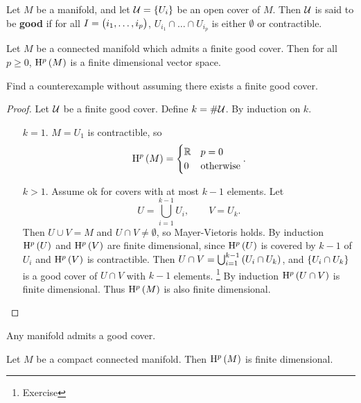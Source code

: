 \begin{definition}
Let $ M $ be a manifold, and let $ \UUU = \cbr{U_i} $ be an open cover of $ M $. Then $ \mathcal{U} $ is said to be \textbf{good} if for all $ I = \br{i_1, \dots, i_p} $, $ U_{i_1} \cap \dots \cap U_{i_p} $ is either $ \emptyset $ or contractible.
\end{definition}

\begin{lemma}
\label{lem:2.35}
Let $ M $ be a connected manifold which admits a finite good cover. Then for all $ p \ge 0 $, $ \H^p\br{M} $ is a finite dimensional vector space.
\end{lemma}

\begin{exercise*}
Find a counterexample without assuming there exists a finite good cover.
\end{exercise*}

\begin{proof}
Let $ \mathcal{U} $ be a finite good cover. Define $ k = \#\mathcal{U} $. By induction on $ k $.
\begin{itemize}[leftmargin=0.5in]
\item[$ k = 1 $.] $ M = U_1 $ is contractible, so
$$ \H^p\br{M} =
\begin{cases}
\RR & p = 0 \\
0 & \text{otherwise}
\end{cases}.
$$
\item[$ k > 1 $.] Assume ok for covers with at most $ k - 1 $ elements. Let
$$ U = \bigcup_{i = 1}^{k - 1} U_i, \qquad V = U_k. $$
Then $ U \cup V = M $ and $ U \cap V \ne \emptyset $, so Mayer-Vietoris holds. By induction $ \H^p\br{U} $ and $ \H^p\br{V} $ are finite dimensional, since $ \H^p\br{U} $ is covered by $ k - 1 $ of $ U_i $ and $ \H^p\br{V} $ is contractible. Then $ U \cap V = \bigcup_{i = 1}^{k - 1} \br{U_i \cap U_k} $, and $ \cbr{U_i \cap U_k} $ is a good cover of $ U \cap V $ with $ k - 1 $ elements. \footnote{Exercise} By induction $ \H^p\br{U \cap V} $ is finite dimensional. Thus $ \H^p\br{M} $ is also finite dimensional.
\end{itemize}
\end{proof}

\pagebreak

\begin{fact*}
Any manifold admits a good cover.
\end{fact*}

\begin{theorem}
Let $ M $ be a compact connected manifold. Then $ \H^p\br{M} $ is finite dimensional.
\end{theorem}

